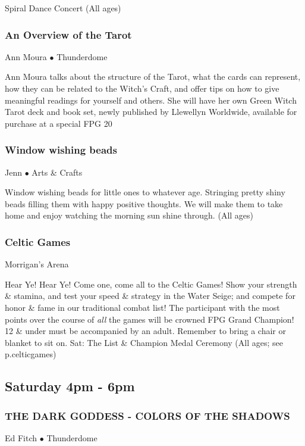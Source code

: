  Spiral Dance Concert {\small (All ages)}

\subsubsection{An Overview of the Tarot}
\label{Sat-Moura1}
{\small Ann Moura $\bullet$  Thunderdome}

 Ann Moura talks about the structure of the Tarot, what the cards can represent, how they can be related to the Witch's Craft, and offer tips on how to give meaningful readings for yourself and others. She will have her own Green Witch Tarot deck and book set, newly published by Llewellyn Worldwide, available for purchase at a special FPG 20%

\subsubsection{Window wishing beads}
\label{Sat-Jordan1}
{\small Jenn $\bullet$  Arts \& Crafts}

 Window wishing beads for little ones to whatever age.  Stringing pretty shiny beads filling them with happy positive thoughts. We will make them to take home and enjoy watching the morning sun shine through. {\small (All ages)}

\subsubsection{Celtic Games}
\label{Sat-Celts3}
{\small  Morrigan's Arena}

 Hear Ye! Hear Ye! Come one, come all to the Celtic Games! Show your 
strength \& stamina, and test your speed \& strategy in the Water 
Seige; and compete for honor \& fame in our traditional combat list! 
 The participant with the most points over the course of \textit{all} 
the games will be crowned FPG Grand Champion! 12 \& under must be 
accompanied by an adult.  Remember to bring a chair or blanket to sit 
on. Sat: The List \& Champion Medal Ceremony  {\small (All ages; see p.{celticgames})}

\subsection{Saturday 4pm - 6pm}

\subsubsection{THE DARK GODDESS - COLORS OF THE SHADOWS}
\label{Sat-Fitch3}
{\small Ed Fitch $\bullet$  Thunderdome}

